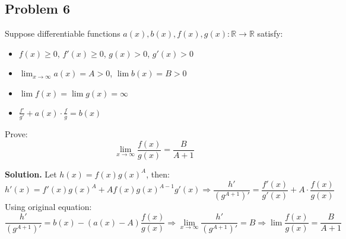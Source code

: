 \documentclass{article}
\begin{document}
\subsection*{Problem 6}

Suppose differentiable functions \( a(x), b(x), f(x), g(x) : \mathbb{R} \to \mathbb{R} \) satisfy:

\begin{itemize}
  \item \( f(x) \geq 0 \), \( f'(x) \geq 0 \), \( g(x) > 0 \), \( g'(x) > 0 \)
  \item \( \lim_{x \to \infty} a(x) = A > 0 \), \( \lim b(x) = B > 0 \)
  \item \( \lim f(x) = \lim g(x) = \infty \)
  \item \( \frac{f'}{g'} + a(x) \cdot \frac{f}{g} = b(x) \)
\end{itemize}

Prove:
\[
\lim_{x \to \infty} \frac{f(x)}{g(x)} = \frac{B}{A + 1}
\]

\textbf{Solution.}
Let \( h(x) = f(x) g(x)^A \), then:
\[
h'(x) = f'(x) g(x)^A + A f(x) g(x)^{A-1} g'(x)
\Rightarrow \frac{h'}{(g^{A+1})'} = \frac{f'(x)}{g'(x)} + A \cdot \frac{f(x)}{g(x)}
\]
Using original equation:
\[
\frac{h'}{(g^{A+1})'} = b(x) - (a(x) - A)\frac{f(x)}{g(x)}
\Rightarrow \lim_{x \to \infty} \frac{h'}{(g^{A+1})'} = B
\Rightarrow \lim \frac{f(x)}{g(x)} = \frac{B}{A + 1}
\]
\end{document}
